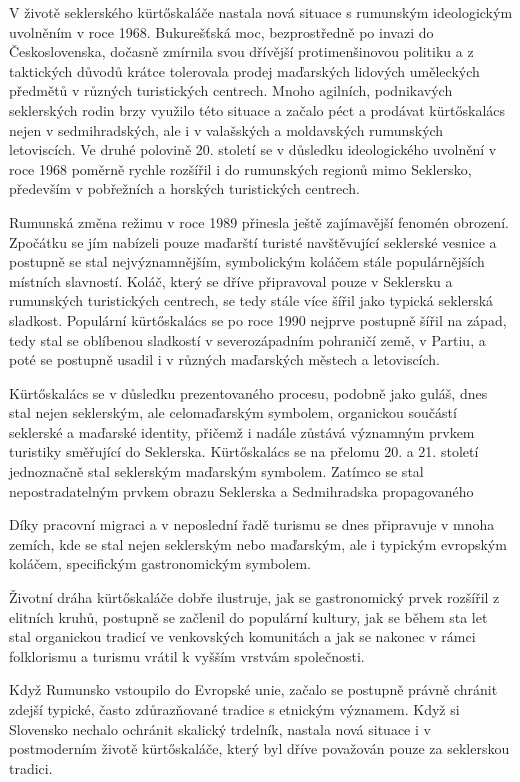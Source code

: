 V životě seklerského kürtőskaláče nastala nová situace s rumunským
ideologickým uvolněním v roce 1968. Bukurešťská moc, bezprostředně po
invazi do Československa, dočasně zmírnila svou dřívější protimenšinovou
politiku a z taktických důvodů krátce tolerovala prodej maďarských
lidových uměleckých předmětů v různých turistických centrech. Mnoho
agilních, podnikavých seklerských rodin brzy využilo této situace a
začalo péct a prodávat kürtőskalács nejen v sedmihradských, ale i v
valašských a moldavských rumunských letoviscích. Ve druhé polovině 20.
století se v důsledku ideologického uvolnění v roce 1968 poměrně rychle
rozšířil i do rumunských regionů mimo Seklersko, především v pobřežních
a horských turistických centrech.

Rumunská změna režimu v roce 1989 přinesla ještě zajímavější fenomén
obrození. Zpočátku se jím nabízeli pouze maďarští turisté navštěvující
seklerské vesnice a postupně se stal nejvýznamnějším, symbolickým
koláčem stále populárnějších místních slavností. Koláč, který se dříve
připravoval pouze v Seklersku a rumunských turistických centrech, se
tedy stále více šířil jako typická seklerská sladkost. Populární
kürtőskalács se po roce 1990 nejprve postupně šířil na západ, tedy stal
se oblíbenou sladkostí v severozápadním pohraničí země, v Partiu, a poté
se postupně usadil i v různých maďarských městech a letoviscích.

Kürtőskalács se v důsledku prezentovaného procesu, podobně jako guláš,
dnes stal nejen seklerským, ale celomaďarským symbolem, organickou
součástí seklerské a maďarské identity, přičemž i nadále zůstává
významným prvkem turistiky směřující do Seklerska. Kürtőskalács se na
přelomu 20. a 21. století jednoznačně stal seklerským maďarským
symbolem. Zatímco se stal nepostradatelným prvkem obrazu Seklerska a
Sedmihradska propagovaného

Díky pracovní migraci a v neposlední řadě turismu se dnes připravuje v
mnoha zemích, kde se stal nejen seklerským nebo maďarským, ale i
typickým evropským koláčem, specifickým gastronomickým symbolem.

Životní dráha kürtőskaláče dobře ilustruje, jak se gastronomický prvek
rozšířil z elitních kruhů, postupně se začlenil do populární kultury,
jak se během sta let stal organickou tradicí ve venkovských komunitách a
jak se nakonec v rámci folklorismu a turismu vrátil k vyšším vrstvám
společnosti.

Když Rumunsko vstoupilo do Evropské unie, začalo se postupně právně
chránit zdejší typické, často zdůrazňované tradice s etnickým významem.
Když si Slovensko nechalo ochránit skalický trdelník, nastala nová
situace i v postmoderním životě kürtőskaláče, který byl dříve považován
pouze za seklerskou tradici.

